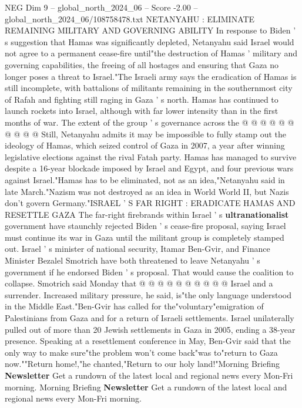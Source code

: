 \begin{textsample}{NEG Dim 9 – global\_north\_2024\_06 – Score -2.00 – global\_north\_2024\_06/108758478.txt}
NETANYAHU : ELIMINATE REMAINING MILITARY AND GOVERNING ABILITY In response to Biden ' s suggestion that Hamas was significantly depleted, Netanyahu said Israel would not agree to a permanent cease-fire until"the destruction of Hamas ' military and governing capabilities, the freeing of all hostages and ensuring that Gaza no longer poses a threat to Israel."The Israeli army says the eradication of Hamas is still incomplete, with battalions of militants remaining in the southernmost city of Rafah and fighting still raging in Gaza ' s north.
Hamas has continued to launch rockets into Israel, although with far lower intensity than in the first months of war.
The extent of the group ' s governance across the @ @ @ @ @ @ @ @ @ @ Still, Netanyahu admits it may be impossible to fully stamp out the ideology of Hamas, which seized control of Gaza in 2007, a year after winning legislative elections against the rival Fatah party.
Hamas has managed to survive despite a 16-year blockade imposed by Israel and Egypt, and four previous wars against Israel."Hamas has to be eliminated, not as an idea,"Netanyahu said in late March."Nazism was not destroyed as an idea in World World II, but Nazis don't govern Germany."ISRAEL ' S FAR RIGHT : ERADICATE HAMAS AND RESETTLE GAZA The far-right firebrands within Israel ' s \textbf{ultranationalist} government have staunchly rejected Biden ' s cease-fire proposal, saying Israel must continue its war in Gaza until the militant group is completely stamped out.
Israel ' s minister of national security, Itamar Ben-Gvir, and Finance Minister Bezalel Smotrich have both threatened to leave Netanyahu ' s government if he endorsed Biden ' s proposal.
That would cause the coalition to collapse.
Smotrich said Monday that @ @ @ @ @ @ @ @ @ @ Israel and a surrender.
Increased military pressure, he said, is"the only language understood in the Middle East."Ben-Gvir has called for the"voluntary"emigration of Palestinians from Gaza and for a return of Israeli settlements.
Israel unilaterally pulled out of more than 20 Jewish settlements in Gaza in 2005, ending a 38-year presence.
Speaking at a resettlement conference in May, Ben-Gvir said that the only way to make sure"the problem won't come back"was to"return to Gaza now.""Return home!,"he chanted,"Return to our holy land!"Morning Briefing \textbf{Newsletter} Get a rundown of the latest local and regional news every Mon-Fri morning.
Morning Briefing \textbf{Newsletter} Get a rundown of the latest local and regional news every Mon-Fri morning.

\end{textsample}
